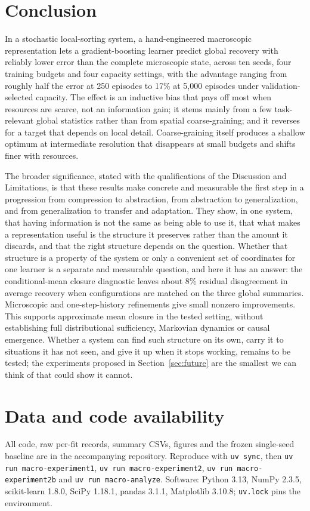 \documentclass[11pt,a4paper]{article}
\begin{document}
\section{Conclusion}

In a stochastic local-sorting system, a hand-engineered macroscopic
representation lets a gradient-boosting learner predict global recovery with
reliably lower error than the complete microscopic state, across ten seeds,
four training budgets and four capacity settings, with the advantage ranging
from roughly half the error at 250 episodes to 17\% at 5,000 episodes under
validation-selected capacity. The effect is an inductive bias that pays off most
when resources are scarce, not an information gain; it stems mainly from a few
task-relevant global statistics rather than from spatial coarse-graining; and it
reverses for a target that depends on local detail. Coarse-graining itself
produces a shallow optimum at intermediate resolution that disappears at small
budgets and shifts finer with resources.

The broader significance, stated with the qualifications of the Discussion and
Limitations, is that these results make concrete and measurable the first step
in a progression from compression to abstraction, from abstraction to
generalization, and from generalization to transfer and adaptation. They show,
in one system, that having information is not the same as being able to use
it, that what makes a representation useful is the structure it preserves
rather than the amount it discards, and that the right structure depends on the
question. Whether that structure is a property of the system or only a
convenient set of coordinates for one learner is a separate and measurable
question, and here it has an answer: the conditional-mean closure diagnostic leaves about 8\% residual
disagreement in average recovery when configurations are matched on the
three global summaries. Microscopic and one-step-history refinements give
small nonzero improvements. This supports approximate mean closure in the
tested setting, without establishing full distributional sufficiency,
Markovian dynamics or causal emergence. Whether a system can find such structure on its own, carry it to
situations it has not seen, and give it up when it stops working, remains to be
tested; the experiments proposed in Section~\ref{sec:future} are the smallest
we can think of that could show it cannot.

\section*{Data and code availability}

All code, raw per-fit records, summary CSVs, figures and the frozen single-seed
baseline are in the accompanying repository. Reproduce with \texttt{uv sync},
then \texttt{uv run macro-experiment1}, \texttt{uv run macro-experiment2},
\texttt{uv run macro-experiment2b} and \texttt{uv run macro-analyze}. Software: Python 3.13, NumPy 2.3.5, scikit-learn
1.8.0, SciPy 1.18.1, pandas 3.1.1, Matplotlib 3.10.8; \texttt{uv.lock} pins the
environment.



\end{document}
